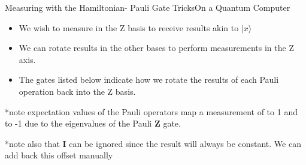 \begin{frame}{Measuring with the Hamiltonian- Pauli Gate Tricks}{On a Quantum Computer}
\vspace{1mm}
 \begin{itemize}
     \item We wish to measure in the Z basis to receive results akin to $| x \rangle$
     \vspace{2mm}
     \item  We can rotate results in the other bases to perform measurements in the Z axis.
     \vspace{2mm}
     \item The gates listed below indicate how we rotate the results of each Pauli operation back into the Z basis.
 \end{itemize}



 
{%
\vspace{-3mm}

 *note expectation values of the Pauli operators map a measurement of \QZero \hspace{0.5mm} to 1 and \QOne \hspace{0.5mm} to -1 due to the eigenvalues of the Pauli \textbf{Z} gate.

 \vspace{4mm}
 *note also that \textbf{I} can be ignored since the result will always be constant. We can add back this offset manually
}
\end{frame}

